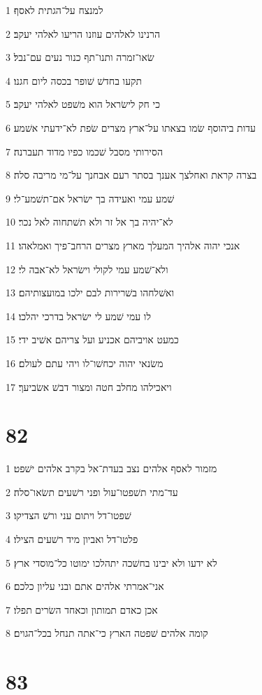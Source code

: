 \par 1 למנצח על־הגתית לאסף׃
\par 2 הרנינו לאלהים עוזנו הריעו לאלהי יעקב׃
\par 3 שׂאו־זמרה ותנו־תף כנור נעים עם־נבל׃
\par 4 תקעו בחדשׁ שׁופר בכסה ליום חגנו׃
\par 5 כי חק לישׂראל הוא משׁפט לאלהי יעקב׃
\par 6 עדות ביהוסף שׂמו בצאתו על־ארץ מצרים שׂפת לא־ידעתי אשׁמע׃
\par 7 הסירותי מסבל שׁכמו כפיו מדוד תעברנה׃
\par 8 בצרה קראת ואחלצך אענך בסתר רעם אבחנך על־מי מריבה סלה׃
\par 9 שׁמע עמי ואעידה בך ישׂראל אם־תשׁמע־לי׃
\par 10 לא־יהיה בך אל זר ולא תשׁתחוה לאל נכר׃
\par 11 אנכי יהוה אלהיך המעלך מארץ מצרים הרחב־פיך ואמלאהו׃
\par 12 ולא־שׁמע עמי לקולי וישׂראל לא־אבה לי׃
\par 13 ואשׁלחהו בשׁרירות לבם ילכו במועצותיהם׃
\par 14 לו עמי שׁמע לי ישׂראל בדרכי יהלכו׃
\par 15 כמעט אויביהם אכניע ועל צריהם אשׁיב ידי׃
\par 16 משׂנאי יהוה יכחשׁו־לו ויהי עתם לעולם׃
\par 17 ויאכילהו מחלב חטה ומצור דבשׁ אשׂביעך׃

\chapter{82}

\par 1 מזמור לאסף אלהים נצב בעדת־אל בקרב אלהים ישׁפט׃
\par 2 עד־מתי תשׁפטו־עול ופני רשׁעים תשׂאו־סלה׃
\par 3 שׁפטו־דל ויתום עני ורשׁ הצדיקו׃
\par 4 פלטו־דל ואביון מיד רשׁעים הצילו׃
\par 5 לא ידעו ולא יבינו בחשׁכה יתהלכו ימוטו כל־מוסדי ארץ׃
\par 6 אני־אמרתי אלהים אתם ובני עליון כלכם׃
\par 7 אכן כאדם תמותון וכאחד השׂרים תפלו׃
\par 8 קומה אלהים שׁפטה הארץ כי־אתה תנחל בכל־הגוים׃

\chapter{83}

